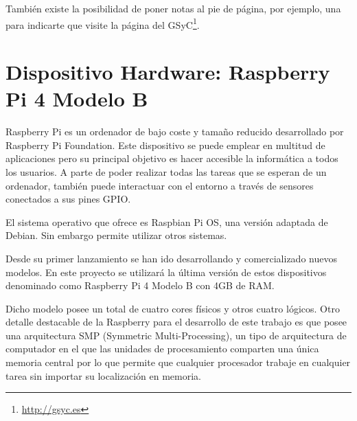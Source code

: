 \documentclass[a4paper, 12pt]{book}
\begin{document}
También existe la posibilidad de poner notas al pie de página, por ejemplo, una para indicarte que visite la página del GSyC\footnote{\url{http://gsyc.es}}.

\section{Dispositivo Hardware: Raspberry Pi 4 Modelo B} 
\label{sec:seccion1}

Raspberry Pi es un ordenador de bajo coste y tamaño reducido desarrollado por Raspberry Pi Foundation. Este dispositivo se puede emplear en  multitud de aplicaciones pero su principal objetivo es hacer accesible la informática a todos los usuarios. A parte de poder realizar todas las tareas que se esperan de un ordenador, también puede interactuar con el entorno a través de sensores conectados a sus pines GPIO.

El sistema operativo que ofrece es Raspbian Pi OS, una versión adaptada de Debian. Sin embargo permite utilizar otros sistemas.

Desde su primer lanzamiento se han ido desarrollando y comercializado nuevos modelos. En este proyecto se utilizará la última versión de estos dispositivos denominado como Raspberry Pi 4 Modelo B con 4GB de RAM.

Dicho modelo posee un total de cuatro cores físicos y otros cuatro lógicos. Otro detalle destacable de la Raspberry para el desarrollo de este trabajo es que posee una arquitectura SMP (Symmetric Multi-Processing), un tipo de arquitectura de computador en el que las unidades de procesamiento comparten una única memoria central por lo que permite que cualquier procesador trabaje en cualquier tarea sin importar su localización en memoria. 

\end{document}
